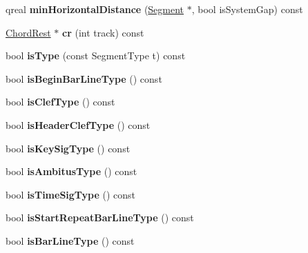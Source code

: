\begin{DoxyCompactItemize}
qreal {\bfseries min\+Horizontal\+Distance} (\hyperlink{class_ms_1_1_segment}{Segment} $\ast$, bool is\+System\+Gap) const
\item 
\mbox{\label{class_ms_1_1_segment_a9adaf3b1b191b949ca562d891c4c5a49}} 
\hyperlink{class_ms_1_1_chord_rest}{Chord\+Rest} $\ast$ {\bfseries cr} (int track) const
\item 
\mbox{\label{class_ms_1_1_segment_a5f0b0ddb0f2fe018c750c261b342e533}} 
bool {\bfseries is\+Type} (const Segment\+Type t) const
\item 
\mbox{\label{class_ms_1_1_segment_a6408d27758a1ab84557a73fefc2cd5d7}} 
bool {\bfseries is\+Begin\+Bar\+Line\+Type} () const
\item 
\mbox{\label{class_ms_1_1_segment_aa7eebe7c9a666d118f322f7bb484454e}} 
bool {\bfseries is\+Clef\+Type} () const
\item 
\mbox{\label{class_ms_1_1_segment_a44acf78d7f350ac07078bd468ecad1c8}} 
bool {\bfseries is\+Header\+Clef\+Type} () const
\item 
\mbox{\label{class_ms_1_1_segment_ad8d0303402a624f94e14f426cd476ddc}} 
bool {\bfseries is\+Key\+Sig\+Type} () const
\item 
\mbox{\label{class_ms_1_1_segment_abe9f71da912f170efab9228863248663}} 
bool {\bfseries is\+Ambitus\+Type} () const
\item 
\mbox{\label{class_ms_1_1_segment_a2869f67639a3de89412695c3cb0f5464}} 
bool {\bfseries is\+Time\+Sig\+Type} () const
\item 
\mbox{\label{class_ms_1_1_segment_a33891c2ac20889369c11702c13a135ec}} 
bool {\bfseries is\+Start\+Repeat\+Bar\+Line\+Type} () const
\item 
\mbox{\label{class_ms_1_1_segment_a2d5c0a44331a6330d8d8aa1381b30f12}} 
bool {\bfseries is\+Bar\+Line\+Type} () const
\item 
\mbox{\label{class_ms_1_1_segment_ae172984bc3f5532adff61a346006fd5d}} 

\end{DoxyCompactItemize}
